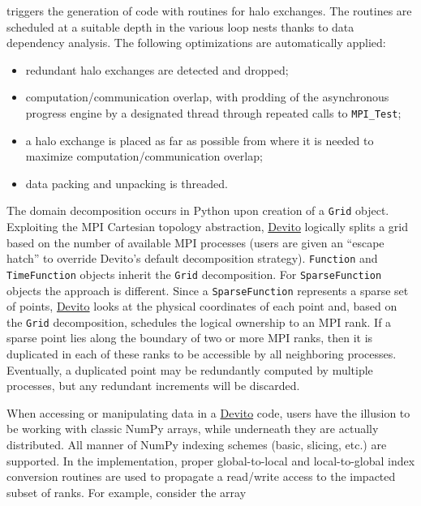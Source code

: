 \documentclass[conference]{IEEEtran}
\begin{document}
triggers the generation of code with routines for halo exchanges. The
routines are scheduled at a suitable depth in the various loop nests
thanks to data dependency analysis. The following optimizations are
automatically applied:

\begin{itemize}
\itemsep1pt\parskip0pt
\item
  redundant halo exchanges are detected and dropped;
\item
  computation/communication overlap, with prodding of the asynchronous
  progress engine by a designated thread through repeated calls to
  \texttt{MPI\_Test};
\item
  a halo exchange is placed as far as possible from where it is needed
  to maximize computation/communication overlap;
\item
  data packing and unpacking is threaded.
\end{itemize}

The domain decomposition occurs in Python upon creation of a
\texttt{Grid} object. Exploiting the MPI Cartesian topology abstraction,
\href{https://github.com/devitocodes/devito}{Devito} logically splits a
grid based on the number of available MPI processes (users are given an
``escape hatch'' to override Devito's default decomposition strategy).
\texttt{Function} and \texttt{TimeFunction} objects inherit the
\texttt{Grid} decomposition. For \texttt{SparseFunction} objects the
approach is different. Since a \texttt{SparseFunction} represents a
sparse set of points,
\href{https://github.com/devitocodes/devito}{Devito} looks at the
physical coordinates of each point and, based on the \texttt{Grid}
decomposition, schedules the logical ownership to an MPI rank. If a
sparse point lies along the boundary of two or more MPI ranks, then it
is duplicated in each of these ranks to be accessible by all neighboring
processes. Eventually, a duplicated point may be redundantly computed by
multiple processes, but any redundant increments will be discarded.

When accessing or manipulating data in a
\href{https://github.com/devitocodes/devito}{Devito} code, users have
the illusion to be working with classic NumPy arrays, while underneath
they are actually distributed. All manner of NumPy indexing schemes
(basic, slicing, etc.) are supported. In the implementation, proper
global-to-local and local-to-global index conversion routines are used
to propagate a read/write access to the impacted subset of ranks. For
example, consider the array
\end{document}
